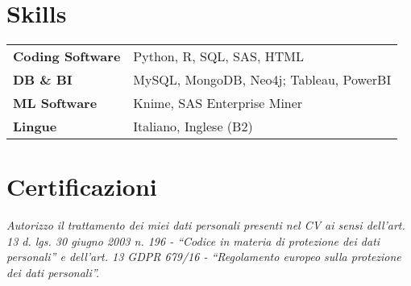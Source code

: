 \documentclass[a4paper,12pt]{article}
\begin{document}
%

\section{Skills}
\begin{tabularx}{\linewidth}{@{}l X@{}}
\textbf{Coding Software} &  \normalsize{Python, R, SQL, SAS, HTML}\\
\textbf{DB \& BI}  &  \normalsize{MySQL, MongoDB, Neo4j; Tableau, PowerBI}\\
\textbf{ML Software} &  \normalsize{Knime, SAS Enterprise Miner}\\
\textbf{Lingue} &  \normalsize{Italiano, Inglese (B2)}\\


\end{tabularx}


\section{Certificazioni}
\begin{refsection}
\nocite{*}
\printbibliography[heading=none]
\end{refsection}





\fontsize{3mm}{1mm}\textit{Autorizzo il trattamento dei miei dati personali presenti nel CV ai sensi dell’art. 13 d. lgs. 30 giugno 2003 n. 196 - “Codice in
materia di protezione dei dati personali” e dell’art. 13 GDPR 679/16 - “Regolamento europeo sulla protezione dei dati
personali”.}

\vfill
\end{document}
